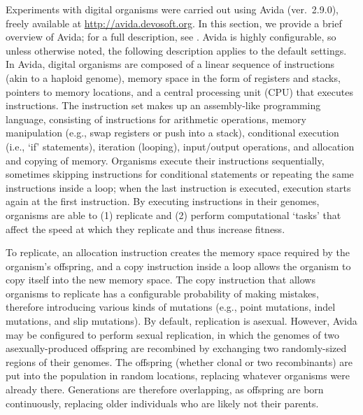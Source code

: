 \begin{doublespace}
Experiments with digital organisms were carried out using Avida (ver.~2.9.0),
freely available at \url{http://avida.devosoft.org}.
%
In this section, we provide a brief overview of Avida;
for a full description, see \citet{ofr04}.
%
Avida is highly configurable, so unless otherwise noted,
the following description applies to the default settings.
%
In Avida, digital organisms are composed of
a linear sequence of instructions (akin to a haploid genome),
memory space in the form of registers and stacks,
pointers to memory locations,
and a central processing unit (CPU) that executes instructions.
%
The instruction set makes up an assembly-like programming language,
consisting of instructions for arithmetic operations,
memory manipulation (e.g., swap registers or push into a stack),
conditional execution (i.e., `if' statements), iteration (looping),
input/output operations, and allocation and copying of memory.
%
Organisms execute their instructions sequentially,
sometimes skipping instructions for conditional statements
or repeating the same instructions inside a loop;
when the last instruction is executed,
execution starts again at the first instruction.
%
By executing instructions in their genomes,
organisms are able to (1) replicate and (2) perform computational `tasks'
that affect the speed at which they replicate and thus increase fitness.



To replicate, an allocation instruction creates the memory space
required by the organism's offspring, and a copy instruction inside a loop
allows the organism to copy itself into the new memory space.
%
The copy instruction that allows organisms to replicate
has a configurable probability of making mistakes,
therefore introducing various kinds of mutations
(e.g., point mutations, indel mutations, and slip mutations).
%
By default, replication is asexual.
%
However, Avida may be configured to perform sexual replication,
in which the genomes of two asexually-produced offspring are recombined
by exchanging two randomly-sized regions of their genomes.
%
The offspring (whether clonal or two recombinants) are put into the population
in random locations, replacing whatever organisms were already there.
%
Generations are therefore overlapping, as offspring are born continuously,
replacing older individuals who are likely not their parents.




\end{doublespace}
